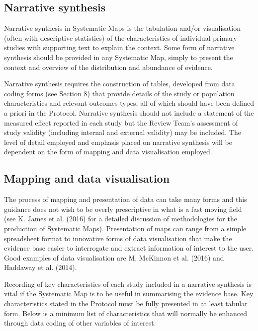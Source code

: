 \documentclass[
  letterpaper,
  DIV=11,
  numbers=noendperiod]{scrreprt}
\begin{document}
\subsection{Narrative synthesis}\label{narrative-synthesis-1}

Narrative synthesis in Systematic Maps is the tabulation and/or
visualisation (often with descriptive statistics) of the characteristics
of individual primary studies with supporting text to explain the
context. Some form of narrative synthesis should be provided in any
Systematic Map, simply to present the context and overview of the
distribution and abundance of evidence.

Narrative synthesis requires the construction of tables, developed from
data coding forms (see Section 8) that provide details of the study or
population characteristics and relevant outcomes types, all of which
should have been defined a priori in the Protocol. Narrative synthesis
should not include a statement of the measured effect reported in each
study but the Review Team's assessment of study validity (including
internal and external validity) may be included. The level of detail
employed and emphasis placed on narrative synthesis will be dependent on
the form of mapping and data visualisation employed.

\subsection{Mapping and data
visualisation}\label{mapping-and-data-visualisation}

The process of mapping and presentation of data can take many forms and
this guidance does not wish to be overly prescriptive in what is a fast
moving field (see K. James et al. (2016) for a detailed discussion of
methodologies for the production of Systematic Maps). Presentation of
maps can range from a simple spreadsheet format to innovative forms of
data visualisation that make the evidence base easier to interrogate and
extract information of interest to the user. Good examples of data
visualisation are M. McKinnon et al. (2016) and Haddaway et al. (2014).

Recording of key characteristics of each study included in a narrative
synthesis is vital if the Systematic Map is to be useful in summarising
the evidence base. Key characteristics stated in the Protocol must be
fully presented in at least tabular form. Below is a minimum list of
characteristics that will normally be enhanced through data coding of
other variables of interest.
\end{document}
